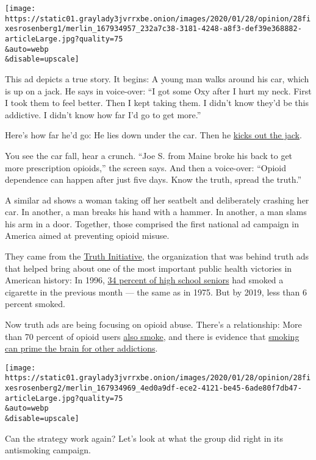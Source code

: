 \texttt{[image: https://static01.graylady3jvrrxbe.onion/images/2020/01/28/opinion/28fixesrosenberg1/merlin\_167934957\_232a7c38-3181-4248-a8f3-def39e368882-articleLarge.jpg?quality=75\\\&auto=webp\\\&disable=upscale]}

This ad depicts a true story. It begins: A young man walks around his
car, which is up on a jack. He says in voice-over: ``I got some Oxy
after I hurt my neck. First I took them to feel better. Then I kept
taking them. I didn't know they'd be this addictive. I didn't know how
far I'd go to get more.''

Here's how far he'd go: He lies down under the car. Then he
\href{https://www.thetruth.com/o/articles/joe}{kicks out the jack}.

You see the car fall, hear a crunch. ``Joe S. from Maine broke his back
to get more prescription opioids,'' the screen says. And then a
voice-over: ``Opioid dependence can happen after just five days. Know
the truth, spread the truth.''

A similar ad shows a woman taking off her seatbelt and deliberately
crashing her car. In another, a man breaks his hand with a hammer. In
another, a man slams his arm in a door. Together, those comprised the
first national ad campaign in America aimed at preventing opioid misuse.

They came from the \href{http://www.truthinitiative.org}{Truth
Initiative}, the organization that was behind truth ads that helped
bring about one of the most important public health victories in
American history: In 1996,
\href{https://www.washingtonpost.com/archive/politics/1997/11/02/officials-seek-a-path-to-cut-into-haze-of-youth-smoking/bdfdf1a0-4c3e-433c-844c-8eca9b746253/}{34
percent of high school seniors} had smoked a cigarette in the previous
month --- the same as in 1975. But by 2019, less than 6 percent smoked.

Now truth ads are being focusing on opioid abuse. There's a
relationship: More than 70 percent of opioid users
\href{https://www.ncbi.nlm.nih.gov/pmc/articles/PMC4990064/}{also
smoke}, and there is evidence that
\href{https://www.sciencedirect.com/science/article/pii/S0091743519303214}{smoking
can prime the brain for other addictions}.

\texttt{[image: https://static01.graylady3jvrrxbe.onion/images/2020/01/28/opinion/28fixesrosenberg2/merlin\_167934969\_4ed0a9df-ece2-4121-be45-6ade80f7db47-articleLarge.jpg?quality=75\\\&auto=webp\\\&disable=upscale]}

Can the strategy work again? Let's look at what the group did right in
its antismoking campaign.

